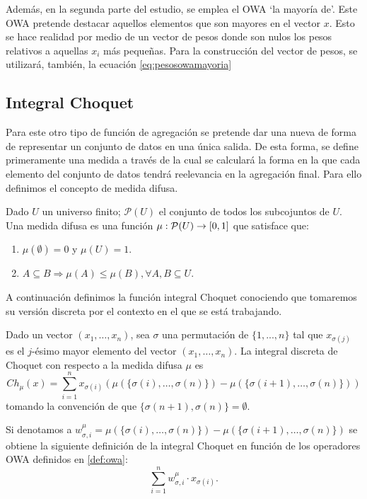 Además, en la segunda parte del estudio, se emplea el OWA `la mayoría de'. Este OWA pretende destacar aquellos elementos que son mayores en el vector $x$. Esto se hace realidad por medio de un vector de pesos donde son nulos los pesos relativos a aquellas $x_i$ más pequeñas. Para la construcción del vector de pesos, se utilizará, también, la ecuación \ref{eq:pesosowamayoria}



\subsection{Integral Choquet}
Para este otro tipo de función \cite{art:choquet, art:sugenochoquet} de agregación se pretende dar una nueva de forma de representar un conjunto de datos en una única salida. De esta forma, se define primeramente una medida a través de la cual se calculará la forma en la que cada elemento del conjunto de datos tendrá reelevancia en la agregación final. Para ello definimos el concepto de medida difusa.
\begin{definition}\label{def:medidadifusa}
Dado $U$ un universo finito; $\mathcal{P}(U)$ el conjunto de todos los subcojuntos de $U$. Una medida difusa es una función $\mu:\mathcal{P}(U)\rightarrow[0,1]$ que satisface que:
\begin{enumerate}
	\item $\mu(\emptyset)=0$ y $\mu(U)=1$.
	\item $A\subseteq B \Rightarrow \mu(A)\leq\mu (B), \forall A, B \subseteq U$.
\end{enumerate}
\end{definition}

A continuación definimos la función integral Choquet conociendo que tomaremos su versión discreta por el contexto en el que se está trabajando.

\begin{definition}\label{def:choquet}
Dado un vector $(x_1,\dots,x_n)$, sea $\sigma$ una permutación de $\{1,...,n\}$ tal que $x_{\sigma(j)}$ es el $j$-ésimo mayor elemento del vector $(x_{1},\dots,x_{n})$. La integral discreta de Choquet con respecto a la medida difusa $\mu$ es 
$$Ch_{\mu}(x)=\sum_{i=1}^{n}x_{\sigma(i)}(\mu(\{\sigma(i),\dots,\sigma(n)\})-\mu(\{\sigma(i+1),\dots,\sigma(n)\}))$$
tomando la convención de que $\{\sigma(n+1),\sigma(n)\}=\emptyset$.
\end{definition}

\begin{proposition}\label{prop:choque2owa}
Si denotamos a $w_{\sigma, i}^{\mu} = \mu(\{\sigma(i),\dots,\sigma(n)\})-\mu(\{\sigma(i+1),\dots,\sigma(n)\})$ se obtiene la siguiente definición de la integral Choquet en función de los operadores OWA definidos en \ref{def:owa}:
$$\sum_{i=1}^{n} w_{\sigma, i}^{\mu} \cdot x_{\sigma(i)}.$$
\end{proposition}



